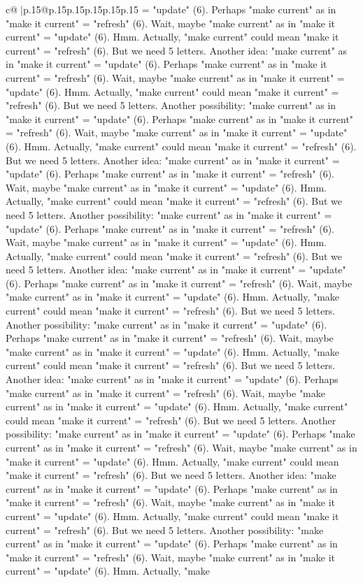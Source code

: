 \documentclass{article}
\begin{document}
{\begin{supertabular}{c@{$\;$}|p{.15\linewidth}@{}p{.15\linewidth}p{.15\linewidth}p{.15\linewidth}p{.15\linewidth}p{.15\linewidth}}
{{{= "update" (6). Perhaps "make current" as in "make it current" = "refresh" (6). Wait, maybe "make current" as in "make it current" = "update" (6). Hmm. Actually, "make current" could mean "make it current" = "refresh" (6). But we need 5 letters. Another idea: "make current" as in "make it current" = "update" (6). Perhaps "make current" as in "make it current" = "refresh" (6). Wait, maybe "make current" as in "make it current" = "update" (6). Hmm. Actually, "make current" could mean "make it current" = "refresh" (6). But we need 5 letters. Another possibility: "make current" as in "make it current" = "update" (6). Perhaps "make current" as in "make it current" = "refresh" (6). Wait, maybe "make current" as in "make it current" = "update" (6). Hmm. Actually, "make current" could mean "make it current" = "refresh" (6). But we need 5 letters. Another idea: "make current" as in "make it current" = "update" (6). Perhaps "make current" as in "make it current" = "refresh" (6). Wait, maybe "make current" as in "make it current" = "update" (6). Hmm. Actually, "make current" could mean "make it current" = "refresh" (6). But we need 5 letters. Another possibility: "make current" as in "make it current" = "update" (6). Perhaps "make current" as in "make it current" = "refresh" (6). Wait, maybe "make current" as in "make it current" = "update" (6). Hmm. Actually, "make current" could mean "make it current" = "refresh" (6). But we need 5 letters. Another idea: "make current" as in "make it current" = "update" (6). Perhaps "make current" as in "make it current" = "refresh" (6). Wait, maybe "make current" as in "make it current" = "update" (6). Hmm. Actually, "make current" could mean "make it current" = "refresh" (6). But we need 5 letters. Another possibility: "make current" as in "make it current" = "update" (6). Perhaps "make current" as in "make it current" = "refresh" (6). Wait, maybe "make current" as in "make it current" = "update" (6). Hmm. Actually, "make current" could mean "make it current" = "refresh" (6). But we need 5 letters. Another idea: "make current" as in "make it current" = "update" (6). Perhaps "make current" as in "make it current" = "refresh" (6). Wait, maybe "make current" as in "make it current" = "update" (6). Hmm. Actually, "make current" could mean "make it current" = "refresh" (6). But we need 5 letters. Another possibility: "make current" as in "make it current" = "update" (6). Perhaps "make current" as in "make it current" = "refresh" (6). Wait, maybe "make current" as in "make it current" = "update" (6). Hmm. Actually, "make current" could mean "make it current" = "refresh" (6). But we need 5 letters. Another idea: "make current" as in "make it current" = "update" (6). Perhaps "make current" as in "make it current" = "refresh" (6). Wait, maybe "make current" as in "make it current" = "update" (6). Hmm. Actually, "make current" could mean "make it current" = "refresh" (6). But we need 5 letters. Another possibility: "make current" as in "make it current" = "update" (6). Perhaps "make current" as in "make it current" = "refresh" (6). Wait, maybe "make current" as in "make it current" = "update" (6). Hmm. Actually, "make }}}
\end{supertabular}}
\end{document}
